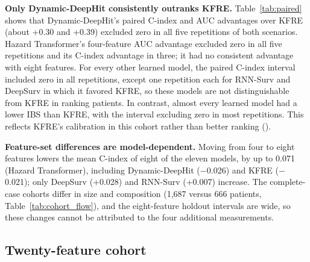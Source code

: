 \documentclass[10pt,letterpaper]{article}
\begin{document}
\textbf{Only Dynamic-DeepHit consistently outranks KFRE.} Table~\ref{tab:paired} shows that Dynamic-DeepHit's paired C-index and AUC advantages over KFRE (about +0.30 and +0.39) excluded zero in all five repetitions of both scenarios. Hazard Transformer's four-feature AUC advantage excluded zero in all five repetitions and its C-index advantage in three; it had no consistent advantage with eight features. For every other learned model, the paired C-index interval included zero in all repetitions, except one repetition each for RNN-Surv and DeepSurv in which it favored KFRE, so these models are not distinguishable from KFRE in ranking patients. In contrast, almost every learned model had a lower IBS than KFRE, with the interval excluding zero in most repetitions. This reflects KFRE's calibration in this cohort rather than better ranking ().

\textbf{Feature-set differences are model-dependent.} Moving from four to eight features lowers the mean C-index of eight of the eleven models, by up to 0.071 (Hazard Transformer), including Dynamic-DeepHit ($-$0.026) and KFRE ($-$0.021); only DeepSurv (+0.028) and RNN-Surv (+0.007) increase. The complete-case cohorts differ in size and composition (1{,}687 versus 666 patients, Table~\ref{tab:cohort_flow}), and the eight-feature holdout intervals are wide, so these changes cannot be attributed to the four additional measurements.

\subsection*{Twenty-feature cohort}
\end{document}

